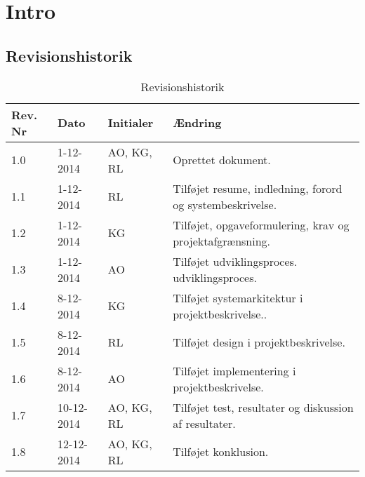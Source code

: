 \chapter{Intro}

\section{Revisionshistorik}
\begin{table}[H]
	\centering
		\begin{tabular}{|p{1.7 cm}|p{2 cm}|p{2.5 cm}|p{6.8 cm}|} 
		\hline
			\textbf{Rev. Nr} & \textbf{Dato}		& \textbf{Initialer} 	& \textbf{Ændring} \\ \hline
			1.0 	& 1-12-2014 & AO, KG, RL  & Oprettet dokument.  \\ \hline
			1.1 	& 1-12-2014 & RL  & Tilføjet resume, indledning, forord \newline og systembeskrivelse. \\ \hline
			1.2 	& 1-12-2014 & KG  & Tilføjet, opgaveformulering, krav \newline og projektafgrænsning. 	\\ \hline
			1.3 	& 1-12-2014 & AO  & Tilføjet udviklingsproces. \newline udviklingsproces.	\\ \hline
			1.4 	& 8-12-2014 & KG  & Tilføjet systemarkitektur \newline i projektbeskrivelse..	\\ \hline
			1.5 	& 8-12-2014 & RL  & Tilføjet design i projektbeskrivelse.	\\ \hline
			1.6 	& 8-12-2014 & AO  & Tilføjet implementering \newline i projektbeskrivelse.	\\ \hline
			1.7 	& 10-12-2014 & AO, KG, RL  & Tilføjet test, resultater og \newline diskussion af resultater.	\\ \hline
			1.8 	& 12-12-2014 & AO, KG, RL  & Tilføjet konklusion.	\\ \hline

		\end{tabular}
	\caption{Revisionshistorik}
\end{table}


\vspace{0.5cm}

